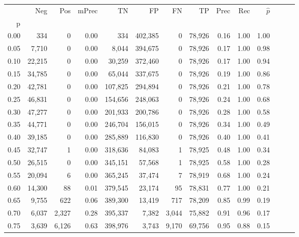 \begin{tabular}{rrrrrrrrrrrrrr}
\toprule
{} &     Neg &     Pos & mPrec &       TN &       FP &      FN &      TP &  Prec &   Rec & $\hat{p}$ \\
p    &         &         &       &          &          &         &         &       &       &           \\
\midrule
0.00 &     334 &       0 &  0.00 &      334 &  402,385 &       0 &  78,926 &  0.16 &  1.00 &      1.00 \\
0.05 &   7,710 &       0 &  0.00 &    8,044 &  394,675 &       0 &  78,926 &  0.17 &  1.00 &      0.98 \\
0.10 &  22,215 &       0 &  0.00 &   30,259 &  372,460 &       0 &  78,926 &  0.17 &  1.00 &      0.94 \\
0.15 &  34,785 &       0 &  0.00 &   65,044 &  337,675 &       0 &  78,926 &  0.19 &  1.00 &      0.86 \\
0.20 &  42,781 &       0 &  0.00 &  107,825 &  294,894 &       0 &  78,926 &  0.21 &  1.00 &      0.78 \\
0.25 &  46,831 &       0 &  0.00 &  154,656 &  248,063 &       0 &  78,926 &  0.24 &  1.00 &      0.68 \\
0.30 &  47,277 &       0 &  0.00 &  201,933 &  200,786 &       0 &  78,926 &  0.28 &  1.00 &      0.58 \\
0.35 &  44,771 &       0 &  0.00 &  246,704 &  156,015 &       0 &  78,926 &  0.34 &  1.00 &      0.49 \\
0.40 &  39,185 &       0 &  0.00 &  285,889 &  116,830 &       0 &  78,926 &  0.40 &  1.00 &      0.41 \\
0.45 &  32,747 &       1 &  0.00 &  318,636 &   84,083 &       1 &  78,925 &  0.48 &  1.00 &      0.34 \\
0.50 &  26,515 &       0 &  0.00 &  345,151 &   57,568 &       1 &  78,925 &  0.58 &  1.00 &      0.28 \\
0.55 &  20,094 &       6 &  0.00 &  365,245 &   37,474 &       7 &  78,919 &  0.68 &  1.00 &      0.24 \\
0.60 &  14,300 &      88 &  0.01 &  379,545 &   23,174 &      95 &  78,831 &  0.77 &  1.00 &      0.21 \\
0.65 &   9,755 &     622 &  0.06 &  389,300 &   13,419 &     717 &  78,209 &  0.85 &  0.99 &      0.19 \\
0.70 &   6,037 &   2,327 &  0.28 &  395,337 &    7,382 &   3,044 &  75,882 &  0.91 &  0.96 &      0.17 \\
0.75 &   3,639 &   6,126 &  0.63 &  398,976 &    3,743 &   9,170 &  69,756 &  0.95 &  0.88 &      0.15 \\

\end{tabular}
